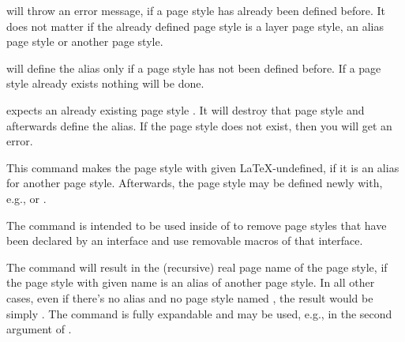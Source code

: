 will throw an error message, if a page style
 has already been defined before. It does not
matter if the already defined page style is a layer page style, an alias page
style or another page style.

 will define the alias only if a page style
 has not been defined before. If a page style
 already exists nothing will be done.

 expects an already existing page style
. It will destroy that page style and afterwards
define the alias. If the page style  does not
exist, then you will get an error.%
%
%
%

\begin{Declaration}
\end{Declaration}
%
This command makes the page style with given 
\LaTeX-undefined, if it is an alias for another page style. Afterwards, the
page style may be defined newly with, e.g., 
or . 

The command is intended to be used inside of
 to remove page styles that have been
declared by an interface and use removable macros of that interface.%

\begin{Declaration}
\end{Declaration}
%
The command will result in the (recursive) real page name of the page style,
if the page style with given name  is an alias of
another page style. In all other cases, even if there's no alias and no page
style named , the result would be simply . The command is fully expandable and may be used, e.g., in the
second argument of .%

